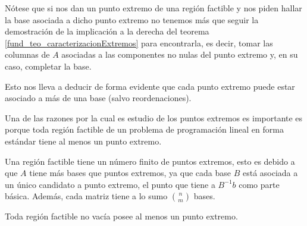 \begin{obs}
	Nótese que si nos dan un punto extremo de una región factible y nos piden hallar la base asociada a dicho punto extremo no tenemos más que seguir la demostración de la implicación a la derecha del teorema \ref{fund_teo_caracterizacionExtremos} para encontrarla, es decir, tomar las columnas de $A$ asociadas a las componentes no nulas del punto extremo y, en su caso, completar la base.
	
	Esto nos lleva a deducir de forma evidente que cada punto extremo puede estar asociado a más de una base (salvo reordenaciones).
\end{obs}
Una de las razones por la cual es estudio de los puntos extremos es importante es porque toda región factible de un problema de programación lineal en forma estándar tiene al menos un punto extremo.
\begin{obs}[Finitud]
	\label{fund_obs_finitudExtremos}
	Una región factible tiene un número finito de puntos extremos, esto es debido a que $A$ tiene más bases que puntos extremos, ya que cada base $B$ está asociada a un único candidato a punto extremo, el punto que tiene a $B^{-1}b$ como parte básica. Además, cada matriz tiene a lo sumo $\binom{n}{m}$ bases.
\end{obs}
\begin{theo}[Existencia]
	\label{fund_teo_existenciaExtremos}
	Toda región factible no vacía posee al menos un punto extremo.
\end{theo}
